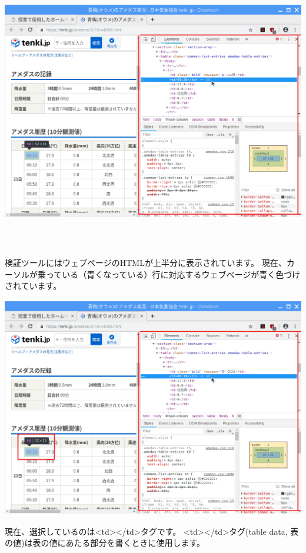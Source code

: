 \documentclass[a4paper,12pt,dvipdfmx]{jarticle}
\begin{document}
\begin{center}
\includegraphics[width=17.006cm,height=12.157cm]{textbook-img035.png}

\end{center}
検証ツールにはウェブページのHTMLが上半分に表示されています。
現在、カーソルが乗っている（青くなっている）行に対応するウェブページが青く色づけされています。



\begin{center}
\includegraphics[width=17.006cm,height=9.643cm]{textbook-img035-2.png}

\end{center}
現在、選択しているのは{\textless}td{\textgreater}{\textless}/td{\textgreater}タグです。
{\textless}td{\textgreater}{\textless}/td{\textgreater}タグ(table
data,
表の値)は表の値にあたる部分を書くときに使用します。
\end{document}
